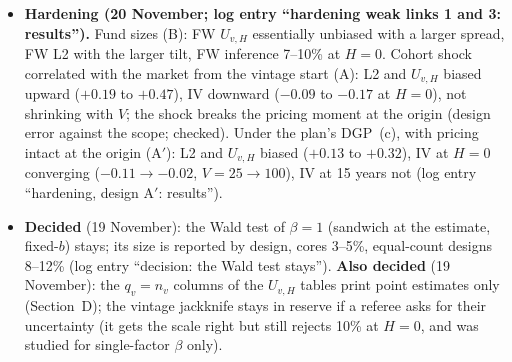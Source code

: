\documentclass[11pt]{article}
\begin{document}
\begin{itemize}
\begin{itemize}
  \item \emph{Inference} (the bullet above and the log): on resampled paths and in equal-count designs L2 and $U_{v,H}$ over-reject (8--16\% at 15 years). Ruled out: the resampled paths, the vintage window, cross-vintage dependence, the Bartlett level. The cause is the sandwich at the estimate.
  \end{itemize}
\item \textbf{Hardening (20 November; log entry ``hardening weak links 1 and 3: results'').} Fund sizes (B): FW $U_{v,H}$ essentially unbiased with a larger spread, FW L2 with the larger tilt, FW inference 7--10\% at $H=0$. Cohort shock correlated with the market from the vintage start (A): L2 and $U_{v,H}$ biased upward ($+0.19$ to $+0.47$), IV downward ($-0.09$ to $-0.17$ at $H=0$), not shrinking with $V$; the shock breaks the pricing moment at the origin (design error against the scope; checked). Under the plan's DGP~(c), with pricing intact at the origin (A$'$): L2 and $U_{v,H}$ biased ($+0.13$ to $+0.32$), IV at $H=0$ converging ($-0.11\to-0.02$, $V=25\to100$), IV at 15 years not (log entry ``hardening, design A$'$: results'').
\item \textbf{Decided} (19 November): the Wald test of $\beta=1$ (sandwich at the estimate, fixed-$b$) stays; its size is reported by design, cores 3--5\%, equal-count designs 8--12\% (log entry ``decision: the Wald test stays''). \textbf{Also decided} (19 November): the $q_v=n_v$ columns of the $U_{v,H}$ tables print point estimates only (Section~D); the vintage jackknife stays in reserve if a referee asks for their uncertainty (it gets the scale right but still rejects 10\% at $H=0$, and was studied for single-factor $\beta$ only).

\end{itemize}
\end{document}
